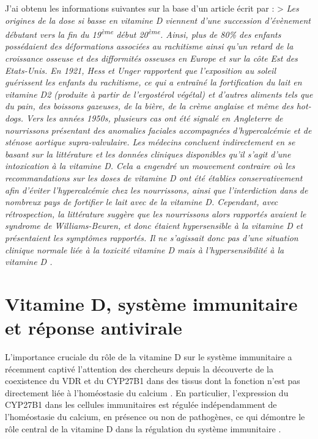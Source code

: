 \documentclass[
  a4paper,
  DIV=11,
  numbers=noendperiod,
  listof=totoc]{scrreprt}
\begin{document}
J'ai obtenu les informations suivantes sur la base d'un article écrit
par \textcite{Holick.2015} : \textgreater{} \emph{Les origines de la
dose si basse en vitamine D viennent d'une succession d'évènement
débutant vers la fin du 19\textsuperscript{ème} début
20\textsuperscript{ème}. Ainsi, plus de 80\% des enfants possédaient des
déformations associées au rachitisme ainsi qu'un retard de la croissance
osseuse et des difformités osseuses en Europe et sur la côte Est des
Etats-Unis. En 1921, Hess et Unger rapportent que l'exposition au soleil
guérissent les enfants du rachitisme, ce qui a entraîné la fortification
du lait en vitamine D2 (produite à partir de l'ergostérol végétal) et
d'autres aliments tels que du pain, des boissons gazeuses, de la bière,
de la crème anglaise et même des hot-dogs. Vers les années 1950s,
plusieurs cas ont été signalé en Angleterre de nourrissons présentant
des anomalies faciales accompagnées d'hypercalcémie et de sténose
aortique supra-valvulaire. Les médecins concluent indirectement en se
basant sur la littérature et les données cliniques disponibles qu'il
s'agit d'une intoxication à la vitamine D. Cela a engendré un mouvement
contraire où les recommandations sur les doses de vitamine D ont été
établies conservativement afin d'éviter l'hypercalcémie chez les
nourrissons, ainsi que l'interdiction dans de nombreux pays de fortifier
le lait avec de la vitamine D. Cependant, avec rétrospection, la
littérature suggère que les nourrissons alors rapportés avaient le
syndrome de Williams-Beuren, et donc étaient hypersensible à la vitamine
D et présentaient les symptômes rapportés. Il ne s'agissait donc pas
d'une situation clinique normale liée à la toxicité vitamine D mais à
l'hypersensibilité à la vitamine D \autocite{Holick.2015}.}

\newpage{}

\chapter{Vitamine D, système immunitaire et réponse
antivirale}\label{vitamine-d-systuxe8me-immunitaire-et-ruxe9ponse-antivirale}

L'importance cruciale du rôle de la vitamine D sur le système
immunitaire a récemment captivé l'attention des chercheurs depuis la
découverte de la coexistence du \ac{VDR} et du \ac{CYP27B1} dans des
tissus dont la fonction n'est pas directement liée à l'homéostasie du
calcium \autocite{Zehnder.2001}. En particulier, l'expression du
\ac{CYP27B1} dans les cellules immunitaires est régulée indépendamment
de l'homéostasie du calcium, en présence ou non de pathogènes, ce qui
démontre le rôle central de la vitamine D dans la régulation du système
immunitaire \autocite{White.2022}.
\end{document}
